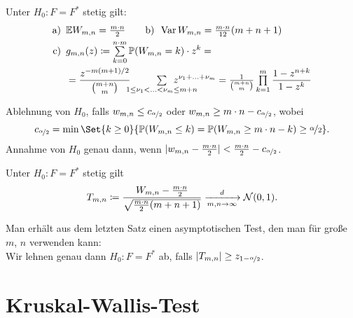 \documentclass{cheat-sheet}
\renewcommand{\P}{\mathbb{P}} %
\newcommand{\E}{\mathbb{E}} %
\DeclareMathOperator{\var}{Var} %
\newcommand{\Normal}{\mathcal{N}} %
\begin{document}
\begin{lem}
  Unter $H_0 : F = F^*$ stetig gilt:
  \begin{align*}
    \text{a)} \enspace
    & \E W_{m,n} = \tfrac{m \cdot n}{2} \qquad
    \text{b)} \enspace
    \var W_{m,n} = \tfrac{m \cdot n}{12} (m + n + 1) \\
    \text{c)} \enspace
    & g_{m,n}(z) \coloneqq \sum_{k=0}^{n \cdot m} \P(W_{m,n} = k) \cdot z^k = \\
    & = \frac{z^{-m (m+1) / 2}}{\binom{m + n}{m}} \enspace\qquad \sum_{\mathclap{1 \leq \nu_1 < \ldots < \nu_m \leq m+n}} \enspace z^{\nu_1 + \ldots + \nu_m}
    = \tfrac{1}{\binom{m + n}{m}} \prod_{k=1}^m \frac{1 - z^{n+k}}{1 - z^k}
  \end{align*}
\end{lem}

\begin{entscheidungsregel}
  Ablehnung von $H_0$, falls $w_{m,n} \leq c_{\nicefrac{\alpha}{2}}$ oder $w_{m,n} \geq m \cdot n - c_{\nicefrac{\alpha}{2}}$, wobei
  \[
    c_{\nicefrac{\alpha}{2}} = \min \Set{k \geq 0}{\P(W_{m,n} \leq k) = \P(W_{m,n} \geq m \cdot n - k) \geq \nicefrac{\alpha}{2}}.
  \]
  Annahme von $H_0$ genau dann, wenn $\lvert w_{m,n} - \tfrac{m \cdot n}{2}\rvert < \tfrac{m \cdot n}{2} - c_{\nicefrac{\alpha}{2}}$.
\end{entscheidungsregel}

\begin{satz}
  Unter $H_0 : F = F^{*}$ stetig gilt
  \[ T_{m,n} \coloneqq \frac{W_{m,n} - \tfrac{m \cdot n}{2}}{\sqrt{\tfrac{m \cdot n}{2} (m + n + 1)}} \xra[m, n \to \infty]{d} \Normal(0, 1). \]
\end{satz}

\begin{entscheidungsregel}
  Man erhält aus dem letzten Satz einen asymptotischen Test, den man für große $m$, $n$ verwenden kann: \\
  Wir lehnen genau dann $H_0 : F = F^*$ ab, falls $\lvert T_{m,n}\rvert \geq z_{1 - \nicefrac{\alpha}{2}}$.
\end{entscheidungsregel}

\section{Kruskal-Wallis-Test}
\end{document}
